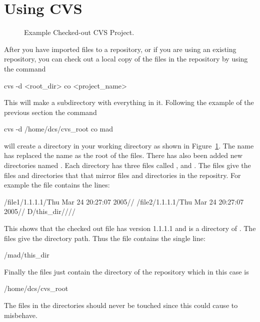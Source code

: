 \section{Using CVS}
\label{s:cvs_use}

\begin{figure}[htb]
\begin{centering}
\caption{Example Checked-out CVS Project.}
\end{centering}
\label{f:cvs2}
\end{figure}

After you have imported files to a \cvs repository, or if you are using
an existing repository, you can check out a local copy of the files in the
repository by using the command
\begin{example}
		cvs -d <root_dir> co <project_name>
\end{example}
This will make a subdirectory  with everything in it.
Following the example of the previous section the command
\begin{example}
  cvs -d /home/dcs/cvs_root co mad
\end{example}
will create a  directory in your working directory as shown in
Figure~\ref{f:cvs2}. The name  has replaced the name
 as the root of the files. There has also been added
new directories named . Each \cvs directory has three files
called ,  and . The 
files give the files and directories that \cvs that mirror files and
directories in the \cvs repositry. For example the file
 contains the lines:
\begin{example}
  /file1/1.1.1.1/Thu Mar 24 20:27:07 2005//
  /file2/1.1.1.1/Thu Mar 24 20:27:07 2005//
  D/this_dir////
\end{example}
This shows that the checked out  file has version 1.1.1.1
and  is a directory of . The  files
give the directory path. Thus the file 
contains the single line:
\begin{example}
  /mad/this_dir
\end{example}
Finally the  files just contain the directory of the
repository which in this case is
\begin{example}
  /home/dcs/cvs_root
\end{example}
The files in the \cvs directories should never be touched since
this could cause \cvs to misbehave. 

